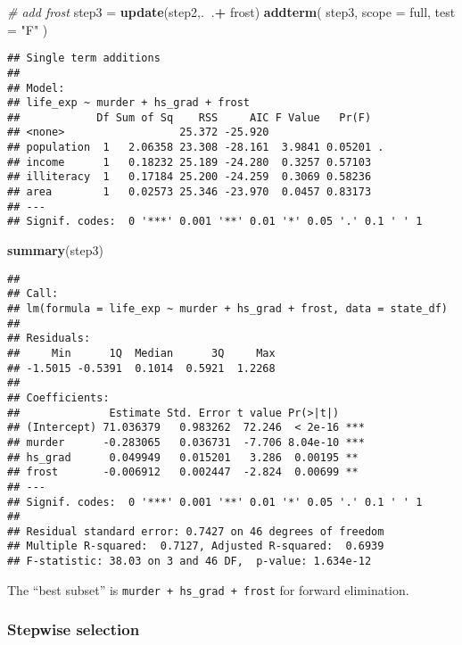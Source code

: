 \documentclass[]{article}
\newenvironment{Shaded}{\begin{snugshade}}{\end{snugshade}}
\newcommand{\CommentTok}[1]{\textcolor[rgb]{0.56,0.35,0.01}{\textit{#1}}}
\newcommand{\DataTypeTok}[1]{\textcolor[rgb]{0.13,0.29,0.53}{#1}}
\newcommand{\KeywordTok}[1]{\textcolor[rgb]{0.13,0.29,0.53}{\textbf{#1}}}
\newcommand{\NormalTok}[1]{#1}
\newcommand{\OperatorTok}[1]{\textcolor[rgb]{0.81,0.36,0.00}{\textbf{#1}}}
\newcommand{\StringTok}[1]{\textcolor[rgb]{0.31,0.60,0.02}{#1}}
\begin{document}
\begin{Shaded}
\begin{Highlighting}[]
\CommentTok{# add frost }
\NormalTok{step3 =}\StringTok{ }\KeywordTok{update}\NormalTok{(step2,.}\OperatorTok{~}\NormalTok{.}\OperatorTok{+}\StringTok{ }\NormalTok{frost) }
\KeywordTok{addterm}\NormalTok{( step3, }\DataTypeTok{scope =}\NormalTok{ full, }\DataTypeTok{test =} \StringTok{"F"}\NormalTok{ )}
\end{Highlighting}
\end{Shaded}

\begin{verbatim}
## Single term additions
## 
## Model:
## life_exp ~ murder + hs_grad + frost
##            Df Sum of Sq    RSS     AIC F Value   Pr(F)  
## <none>                  25.372 -25.920                  
## population  1   2.06358 23.308 -28.161  3.9841 0.05201 .
## income      1   0.18232 25.189 -24.280  0.3257 0.57103  
## illiteracy  1   0.17184 25.200 -24.259  0.3069 0.58236  
## area        1   0.02573 25.346 -23.970  0.0457 0.83173  
## ---
## Signif. codes:  0 '***' 0.001 '**' 0.01 '*' 0.05 '.' 0.1 ' ' 1
\end{verbatim}

\begin{Shaded}
\begin{Highlighting}[]
\KeywordTok{summary}\NormalTok{(step3)}
\end{Highlighting}
\end{Shaded}

\begin{verbatim}
## 
## Call:
## lm(formula = life_exp ~ murder + hs_grad + frost, data = state_df)
## 
## Residuals:
##     Min      1Q  Median      3Q     Max 
## -1.5015 -0.5391  0.1014  0.5921  1.2268 
## 
## Coefficients:
##              Estimate Std. Error t value Pr(>|t|)    
## (Intercept) 71.036379   0.983262  72.246  < 2e-16 ***
## murder      -0.283065   0.036731  -7.706 8.04e-10 ***
## hs_grad      0.049949   0.015201   3.286  0.00195 ** 
## frost       -0.006912   0.002447  -2.824  0.00699 ** 
## ---
## Signif. codes:  0 '***' 0.001 '**' 0.01 '*' 0.05 '.' 0.1 ' ' 1
## 
## Residual standard error: 0.7427 on 46 degrees of freedom
## Multiple R-squared:  0.7127, Adjusted R-squared:  0.6939 
## F-statistic: 38.03 on 3 and 46 DF,  p-value: 1.634e-12
\end{verbatim}

The ``best subset'' is \texttt{murder\ +\ hs\_grad\ +\ frost} for
forward elimination.

\hypertarget{stepwise-selection}{%
\subsubsection{Stepwise selection}\label{stepwise-selection}}
\end{document}
